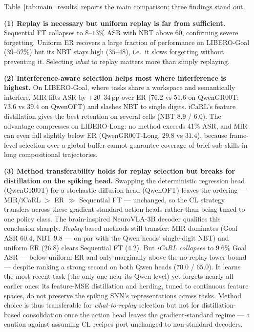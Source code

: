 Table~\ref{tab:main_results} reports the main comparison; three findings stand out.

\textbf{(1) Replay is necessary but uniform replay is far from sufficient.} Sequential FT collapses to $8$--$13\%$ ASR with NBT above $60$, confirming severe forgetting. Uniform ER recovers a large fraction of performance on LIBERO-Goal ($39$--$52\%$) but its NBT stays high ($35$--$48$), i.e.\ it slows forgetting without preventing it. Selecting \emph{what} to replay matters more than simply replaying.

\textbf{(2) Interference-aware selection helps most where interference is highest.} On LIBERO-Goal, where tasks share a workspace and semantically interfere, MIR lifts ASR by $+20$--$34$\,pp over ER ($76.2$ vs $51.6$ on QwenGR00T; $73.6$ vs $39.4$ on QwenOFT) and slashes NBT to single digits. iCaRL's feature distillation gives the best retention on several cells (NBT $8.9$ / $6.0$). The advantage compresses on LIBERO-Long: no method exceeds $41\%$ ASR, and MIR can even fall slightly below ER (QwenGR00T-Long, $29.8$ vs $31.4$), because frame-level selection over a global buffer cannot guarantee coverage of brief sub-skills in long compositional trajectories.

\textbf{(3) Method transferability holds for replay selection but breaks for distillation on the spiking head.} Swapping the deterministic regression head (QwenGR00T) for a stochastic diffusion head (QwenOFT) leaves the ordering --- MIR/iCaRL $>$ ER $\gg$ Sequential FT --- unchanged, so the CL strategy transfers across these gradient-standard action heads rather than being tuned to one policy class. The brain-inspired NeuroVLA-3B decoder qualifies this conclusion sharply. \emph{Replay}-based methods still transfer: MIR dominates (Goal ASR $60.4$, NBT $9.8$ --- on par with the Qwen heads' single-digit NBT) and uniform ER ($26.8$) clears Sequential FT ($4.2$). But \emph{iCaRL collapses} to $9.6\%$ Goal ASR --- below uniform ER and only marginally above the no-replay lower bound --- despite ranking a strong second on both Qwen heads ($70.0$ / $65.0$). It learns the most recent task (the only one near its Qwen level) yet forgets nearly all earlier ones: its feature-MSE distillation and herding, tuned to continuous feature spaces, do not preserve the spiking SNN's representations across tasks. Method choice is thus transferable for \emph{what-to-replay} selection but not for distillation-based consolidation once the action head leaves the gradient-standard regime --- a caution against assuming CL recipes port unchanged to non-standard decoders.

